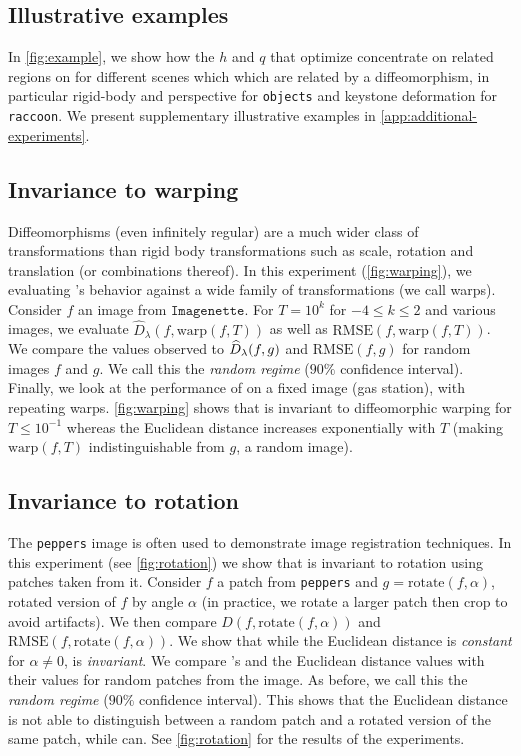 \subsection{Illustrative examples}\label{sec:illustration}

In \cref{fig:example}, we show how the $h$ and $q$ that optimize \Diffy concentrate on related regions on for different scenes which which are related by a diffeomorphism, in particular rigid-body and perspective for \texttt{objects} and keystone deformation for \texttt{raccoon}. We present supplementary illustrative examples in \cref{app:additional-experiments}.

\subsection{Invariance to warping}\label{sec:invariance-warping}
Diffeomorphisms (even infinitely regular) are a much wider class of transformations than rigid body transformations such as scale, rotation and translation (or combinations thereof). In this experiment (\cref{fig:warping}), we evaluating \Diffy's behavior against a wide family of transformations (we call warps). Consider $f$ an image from $\texttt{Imagenette}$. For $T = 10^{k}$ for $-4 \leq k \leq 2$ and various images, we evaluate $\widehat D_\lambda(f, \text{warp}(f, T))$ as well as $\textrm{RMSE}(f, \text{warp}(f, T))$. We compare the values observed to $\widehat D_\lambda(f, g)$ and $\textrm{RMSE}(f, g)$ for random images $f$ and $g$. We call this the \emph{random regime} ($90\%$ confidence interval). Finally, we look at the performance of \Diffy on a fixed image (gas station), with repeating warps. \cref{fig:warping} shows that \Diffy is invariant to diffeomorphic warping for $T \leq 10^{-1}$ whereas the Euclidean distance increases exponentially with $T$ (making $\text{warp}(f, T)$ indistinguishable from $g$, a random image).

\subsection{Invariance to rotation}\label{sec:invariance-rotation}
The \texttt{peppers} image is often used to demonstrate image registration techniques. In this experiment (see \cref{fig:rotation}) we show that \Diffy is invariant to rotation using patches taken from it. Consider $f$ a patch from \texttt{peppers} and $g = \text{rotate}(f, \alpha)$, rotated version of $f$ by angle $\alpha$ (in practice, we rotate a larger patch then crop to avoid artifacts). We then compare $D(f, \text{rotate}(f, \alpha))$ and $\textrm{RMSE}(f, \text{rotate}(f, \alpha))$. We show that while the Euclidean distance is \emph{constant} for $\alpha \neq 0$, \Diffy is \emph{invariant}. We compare \Diffy's and the Euclidean distance values with their values for random patches from the image. As before, we call this the \emph{random regime} ($90\%$ confidence interval). This shows that the Euclidean distance is not able to distinguish between a random patch and a rotated version of the same patch, while \Diffy can. See \cref{fig:rotation} for the results of the experiments.

